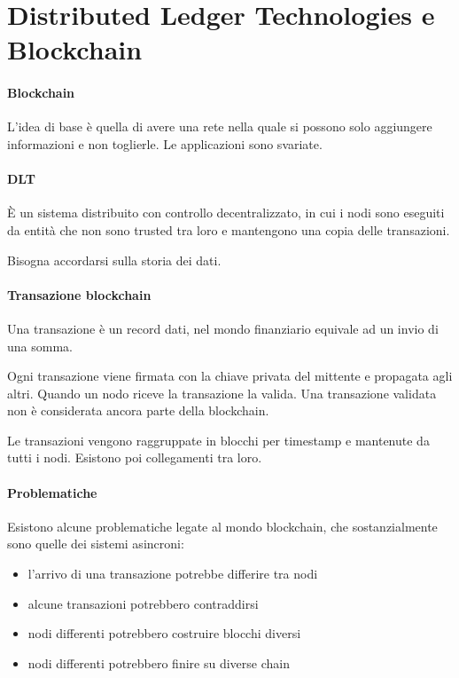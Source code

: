 \section{Distributed Ledger Technologies e Blockchain}

\paragraph{Blockchain}
L'idea di base è quella di avere una rete nella quale 
si possono solo aggiungere informazioni e non toglierle. 
Le applicazioni sono svariate.

\paragraph{DLT}
È un sistema distribuito con controllo decentralizzato, in cui i 
nodi sono eseguiti da entità che non sono trusted tra loro 
e mantengono una copia delle transazioni.

Bisogna accordarsi sulla storia dei dati.

\paragraph{Transazione blockchain}
Una transazione è un record dati, nel mondo finanziario
equivale ad un invio di una somma.

Ogni transazione viene firmata con la chiave privata del mittente e propagata 
agli altri. 
Quando un nodo riceve la transazione la valida. Una transazione validata non 
è considerata ancora parte della blockchain.

Le transazioni vengono raggruppate in blocchi per timestamp e mantenute 
da tutti i nodi. Esistono poi collegamenti tra loro.

\paragraph{Problematiche}
Esistono alcune problematiche legate al mondo blockchain, che sostanzialmente 
sono quelle dei sistemi asincroni:
\begin{itemize}
    \item l'arrivo di una transazione potrebbe differire tra nodi
    \item alcune transazioni potrebbero contraddirsi
    \item nodi differenti potrebbero costruire blocchi diversi
    \item nodi differenti potrebbero finire su diverse chain
\end{itemize}

